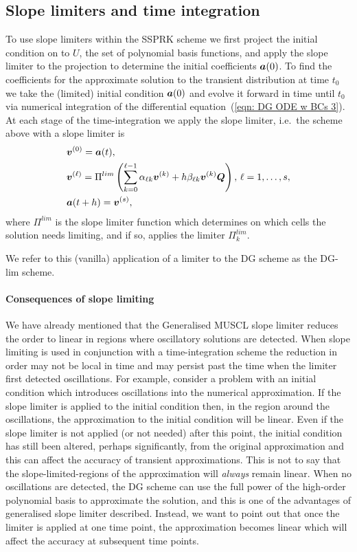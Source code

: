 \subsection{Slope limiters and time integration}\label{subsec: slope lim and int}
To use slope limiters within the SSPRK scheme we first project the initial condition on to \(U\), the set of polynomial basis functions, and apply the slope limiter to the projection to determine the initial coefficients \(\boldsymbol a(0)\). To find the coefficients for the approximate solution to the transient distribution at time \(t_0\) we take the (limited) initial condition \(\boldsymbol a(0)\) and evolve it forward in time until \(t_0\) via numerical integration of the differential equation~(\ref{eqn: DG ODE w BCs 3}). At each stage of the time-integration we apply the slope limiter, i.e.~the scheme above with a slope limiter is 
\begin{align*}
	&\boldsymbol v^{(0)} = \boldsymbol a(t),\\
	&\boldsymbol v^{(\ell)} = \Pi^{lim}\left(\sum_{k=0}^{\ell-1} \alpha_{\ell k}\boldsymbol v^{(k)} + h\beta_{\ell k}  \boldsymbol v^{(k)}\boldsymbol Q\right),\, \ell = 1,\dots,s,\\
	&\boldsymbol a(t+h) =\boldsymbol v^{(s)},
\end{align*} 
where \(\Pi^{lim}\) is the slope limiter function which determines on which cells the solution needs limiting, and if so, applies the limiter \(\Pi_k^{lim}\). 

We refer to this (vanilla) application of a limiter to the DG scheme as the DG-lim scheme. 

\paragraph{Consequences of slope limiting} We have already mentioned that the Generalised MUSCL slope limiter reduces the order to linear in regions where oscillatory solutions are detected. When slope limiting is used in conjunction with a time-integration scheme the reduction in order may not be local in time and may persist past the time when the limiter first detected oscillations. For example, consider a problem with an initial condition which introduces oscillations into the numerical approximation. If the slope limiter is applied to the initial condition then, in the region around the oscillations, the approximation to the initial condition will be linear. Even if the slope limiter is not applied (or not needed) after this point, the initial condition has still been altered, perhaps significantly, from the original approximation and this can affect the accuracy of transient approximations. This is not to say that the slope-limited-regions of the approximation will \emph{always} remain linear. When no oscillations are detected, the DG scheme can use the full power of the high-order polynomial basis to approximate the solution, and this is one of the advantages of generalised slope limiter described. Instead, we want to point out that once the limiter is applied at one time point, the approximation becomes linear which will affect the accuracy at subsequent time points. 


